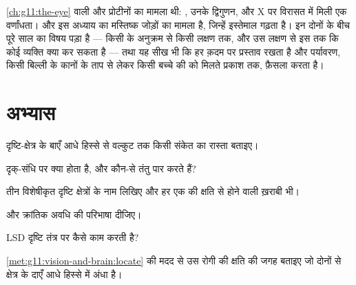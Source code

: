 \begin{remark}[इस वर्ष ने क्या दिखाया]\label{rem:g11:vision-and-brain:year}
\cref{ch:g11:the-eye} वाली   और प्रोटीनों का मामला थी: ,
उनके द्विगुणन, और X पर विरासत में मिली एक वर्णांधता। और इस अध्याय का
मस्तिष्क जोड़ों का मामला है, जिन्हें इस्तेमाल गढ़ता है। इन दोनों के बीच पूरे
साल का विषय पड़ा है --- किसी  के अनुक्रम से किसी लक्षण तक, और उस लक्षण
से इस तक कि कोई व्यक्ति क्या कर सकता है --- तथा यह सीख भी कि हर क़दम पर
 प्रस्ताव रखता है और पर्यावरण, किसी बिल्ली के कानों के ताप से लेकर
किसी बच्चे की  को मिलते प्रकाश तक, फ़ैसला करता है।
\end{remark}

\section{अभ्यास}

\begin{exercise}[$\star$]\label{exo:g11:vision-and-brain:1}
दृष्टि-क्षेत्र के बाएँ आधे हिस्से से वल्कुट तक किसी संकेत का रास्ता बताइए।
\end{exercise}

\begin{exercise}[$\star$]\label{exo:g11:vision-and-brain:2}
दृक्-संधि पर क्या होता है, और कौन-से तंतु पार करते हैं?
\end{exercise}

\begin{exercise}[$\star$]\label{exo:g11:vision-and-brain:3}
तीन विशेषीकृत दृष्टि क्षेत्रों के नाम लिखिए और हर एक की क्षति से होने वाली
ख़राबी भी।
\end{exercise}

\begin{exercise}[$\star$]\label{exo:g11:vision-and-brain:4}
 और क्रांतिक अवधि की परिभाषा दीजिए।
\end{exercise}

\begin{exercise}[$\star$]\label{exo:g11:vision-and-brain:5}
LSD दृष्टि तंत्र पर कैसे काम करती है?
\end{exercise}

\begin{exercise}[$\star\star$]\label{exo:g11:vision-and-brain:6}
\cref{met:g11:vision-and-brain:locate} की मदद से उस रोगी की क्षति की जगह
बताइए जो दोनों  से क्षेत्र के दाएँ आधे हिस्से में अंधा है।
\end{exercise}

